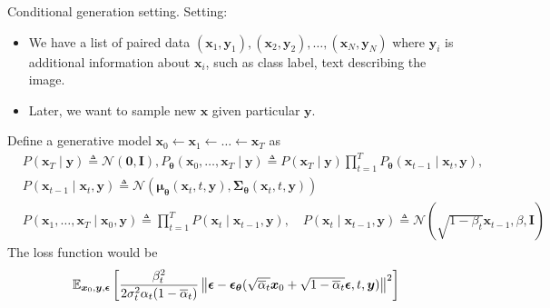\documentclass[10pt,xcolor={usenames,dvipsnames,table},aspectratio=169]{beamer}
\begin{document}
\begin{frame}{Conditional generation setting.}
    Setting:
    \begin{itemize}
        \item We have a list of paired data $(\bm{x}_1, \bm{y}_1), (\bm{x}_2, \bm{y}_2), \ldots , (\bm{x}_N, \bm{y}_N)$ where $\bm{y}_i$ is additional information about $\bm{x}_i$, such as class label, text describing the image.
        \item Later, we want to sample new $\bm{x}$ given particular $\bm{y}$.
    \end{itemize}
Define a generative model $\bm{x}_0 \leftarrow \bm{x}_1 \leftarrow \ldots  \leftarrow \bm{x}_T$ as
\begin{align}
&P(\bm{x}_T \mid \bm{y}) \triangleq \mathcal{N}(\bm{0}, \bm{I}), 
P_{\boldsymbol \theta}(\bm{x}_0, \ldots , \bm{x}_T \mid \bm{y}) \triangleq P(\bm{x}_T \mid \bm{y}) \prod_{t=1}^{T} P_{\boldsymbol \theta}(\bm{x}_{t-1} \mid \bm{x}_t, \bm{y}), \\
&P(\bm{x}_{t-1} \mid \bm{x}_{t}, \bm{y}) \triangleq \mathcal{N}(\boldsymbol \mu_{\boldsymbol \theta}(\bm{x}_t, t, \bm{y}), \boldsymbol \Sigma_{\boldsymbol \theta}(\bm{x}_t, t, \bm{y})) \\
&P(\bm{x}_1, \ldots , \bm{x}_T \mid \bm{x}_0, \bm{y})  \triangleq \prod_{t=1}^{T} P(\bm{x}_t \mid \bm{x}_{t-1}, \bm{y}), \quad P(\bm{x}_t \mid \bm{x}_{t-1}, \bm{y}) \triangleq \mathcal{N}(\sqrt{1- \beta_t} \bm{x}_{t-1}, \beta, \bm{I})
\end{align}
The loss function would be
    \[
    \mathbb{E}_{\bm{x}_0, \bm{y}, \boldsymbol \epsilon} \left[ \dfrac{\beta_t^2}{2\sigma^2_t \alpha_t(1- \overline{\alpha}_t)} \left\lVert\boldsymbol \epsilon - \boldsymbol \epsilon_{\boldsymbol \theta}(\sqrt{\overline{\alpha}_t} \bm{x}_0 + \sqrt{1-\overline{\alpha}_t} \boldsymbol \epsilon, t, \bm{y})\right\rVert^2 \right]
    \] 

\end{frame}
\end{document}
